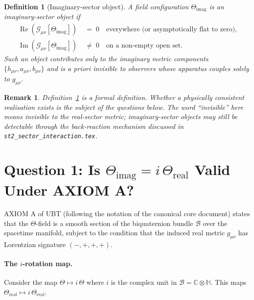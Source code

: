 \documentclass[12pt]{article}
\newtheorem{definition}{Definition}
\newtheorem{remark}{Remark}
\begin{document}
\begin{definition}[Imaginary-sector object]
\label{def:imag_obj}
A field configuration $\Theta_\mathrm{imag}$ is an
\emph{imaginary-sector object} if
\begin{align}
  \operatorname{Re}\!\left(\mathcal{G}_{\mu\nu}[\Theta_\mathrm{imag}]\right)
  &\;=\; 0
  \quad \text{everywhere (or asymptotically flat to zero),}
  \label{eq:imag_cond1}\\
  \operatorname{Im}\!\left(\mathcal{G}_{\mu\nu}[\Theta_\mathrm{imag}]\right)
  &\;\neq\; 0
  \quad \text{on a non-empty open set.}
  \label{eq:imag_cond2}
\end{align}
Such an object contributes \emph{only} to the imaginary metric
components $\{h_{\mu\nu}, a_{\mu\nu}, b_{\mu\nu}\}$ and is
\emph{a priori} invisible to observers whose apparatus couples
solely to $g_{\mu\nu}$.
\end{definition}

\begin{remark}
Definition~\ref{def:imag_obj} is a \emph{formal} definition.
Whether a physically consistent realisation exists is the subject
of the questions below.  The word ``invisible'' here means
invisible to the real-sector metric; imaginary-sector objects
may still be detectable through the back-reaction mechanism
discussed in \texttt{st2\_sector\_interaction.tex}.
\end{remark}

\section{Question 1: Is $\Theta_\mathrm{imag} = i\,\Theta_\mathrm{real}$
Valid Under AXIOM A?}

AXIOM A of UBT (following the notation of the canonical core document)
states that the $\Theta$-field is a smooth section of the biquaternion
bundle $\mathcal{B}$ over the spacetime manifold, subject to the
condition that the induced real metric $g_{\mu\nu}$ has Lorentzian
signature $(-,+,+,+)$.

\paragraph{The $i$-rotation map.}
Consider the map $\Theta \mapsto i\,\Theta$ where $i$ is the
complex unit in $\mathcal{B} = \mathbb{C}\otimes\mathbb{H}$.
This maps $\Theta_\mathrm{real} \mapsto i\,\Theta_\mathrm{real}$.
\end{document}

